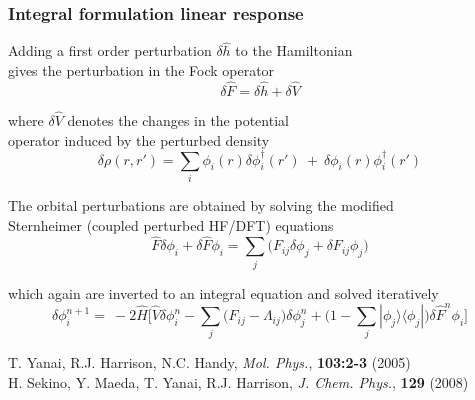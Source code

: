 \begin{frame}
\frametitle{Integral formulation linear response}
\centering
Adding a first order perturbation $\delta\hat{h}$ to the Hamiltonian \\
gives the perturbation in the Fock operator
\begin{equation}
    \nonumber
    \delta\hat{F} = \delta\hat{h} + \delta \hat{V}
\end{equation}


\vspace{6mm}
where $\delta\hat{V}$ denotes the changes in the potential \\
operator induced by the perturbed density
\begin{equation}
    \nonumber
    \delta \rho(r,r') =
    \sum_i \phi_i(r)\delta\phi_i^\dag(r')\ +\ 
    \delta\phi_i(r)\phi_i^\dag(r')
\end{equation}

\pause

\vspace{6mm}
The orbital perturbations are obtained by solving the modified \\
Sternheimer (coupled perturbed HF/DFT) equations
\begin{equation}
    \nonumber
    \hat{F}\delta\phi_i + \delta\hat{F}\phi_i = 
    \sum_j \Big(F_{ij}\delta\phi_j + \delta F_{ij}\phi_j\Big)
\end{equation}

\vspace{6mm}
which again are inverted to an integral equation and solved iteratively
\begin{equation}
    \nonumber
    \delta\phi_i^{n+1} =\ 
    -2\hat{H}\Big[\hat{V} \delta\phi_i^n
    - \sum_j \big(F_{ij} - \Lambda_{ij}\big)\delta\phi_j^n
    + \Big(1 - \sum_j|\phi_j\rangle\langle\phi_j|\Big) \delta\hat{F}^n\phi_i
    \Big]
\end{equation}

\vspace{5mm}
\tiny
T. Yanai, R.J. Harrison, N.C. Handy,
{\it Mol. Phys.},
\textbf{103:2-3} 
(2005)\\
H. Sekino, Y. Maeda, T. Yanai, R.J. Harrison,
{\it J. Chem. Phys.},
\textbf{129} 
(2008)

\end{frame}



